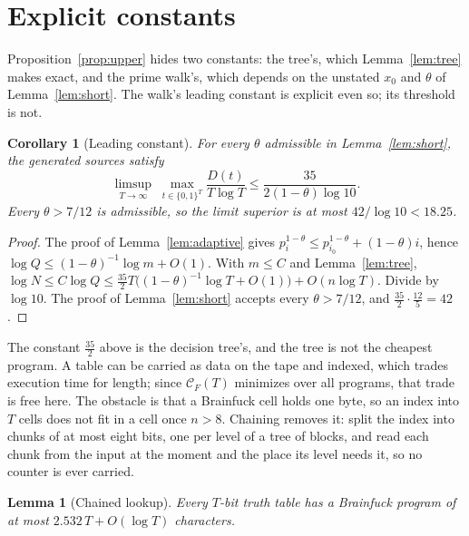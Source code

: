 \documentclass[11pt]{article}
\newtheorem{lemma}[theorem]{Lemma}
\newtheorem{corollary}[theorem]{Corollary}
\theoremstyle{remark}
\newcommand{\CF}{\mathcal C_F}
\begin{document}
\section{Explicit constants}

Proposition~\ref{prop:upper} hides two constants: the tree's, which
Lemma~\ref{lem:tree} makes exact, and the prime walk's, which depends on the
unstated $x_0$ and $\theta$ of Lemma~\ref{lem:short}.  The walk's leading
constant is explicit even so; its threshold is not.

\begin{corollary}[Leading constant]\label{cor:leading}
For every $\theta$ admissible in Lemma~\ref{lem:short}, the generated
sources satisfy
\[
  \limsup_{T\to\infty}\;\max_{t\in\{0,1\}^T}\frac{D(t)}{T\log T}
  \le\frac{35}{2(1-\theta)\log10}.
\]
Every $\theta>7/12$ is admissible, so the limit superior is at most
$42/\log10<18.25$.
\end{corollary}

\begin{proof}
The proof of Lemma~\ref{lem:adaptive} gives
$p_i^{1-\theta}\le p_{i_0}^{1-\theta}+(1-\theta)i$, hence
$\log Q\le(1-\theta)^{-1}\log m+O(1)$.  With $m\le C$ and
Lemma~\ref{lem:tree},
$\log N\le C\log Q\le\frac{35}{2}T\bigl((1-\theta)^{-1}\log T+O(1)\bigr)
+O(n\log T)$.  Divide by $\log10$.  The proof of Lemma~\ref{lem:short}
accepts every $\theta>7/12$, and $\frac{35}{2}\cdot\frac{12}{5}=42$.
\end{proof}

The constant $\frac{35}{2}$ above is the decision tree's, and the tree is not
the cheapest program.  A table can be carried as data on the tape and indexed,
which trades execution time for length; since $\CF(T)$ minimizes over
all programs, that trade is free here.  The obstacle is that a Brainfuck cell
holds one byte, so an index into $T$ cells does not fit in a cell once
$n>8$.  Chaining removes it: split the index into chunks of at most eight
bits, one per level of a tree of blocks, and read each chunk from the input at
the moment and the place its level needs it, so no counter is ever carried.

\begin{lemma}[Chained lookup]\label{lem:chain}
Every $T$-bit truth table has a Brainfuck program of at most
$2.532\,T+O(\log T)$ characters.
\end{lemma}
\end{document}
